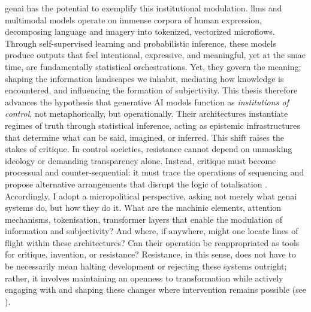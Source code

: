 \Gls{genai}  has the potential to exemplify this institutional modulation. \Glspl{llm}  and multimodal models operate on immense corpora of human expression, decomposing language and imagery into tokenized, vectorized microflows. Through self-supervised learning and probabilistic inference, these models produce outputs that feel intentional, expressive, and meaningful, yet at the smae time, are fundamentally statistical orchestrations. Yet, they govern the meaning; shaping the information landscapes we inhabit, mediating how knowledge is encountered, and influencing the formation of subjectivity.
This thesis therefore advances the hypothesis that generative AI models function as \emph{institutions of control}, not metaphorically, but operationally. Their architectures instantiate regimes of truth through statistical inference, acting as epistemic infrastructures that determine what can be said, imagined, or inferred. This shift raises the stakes of critique. In control societies, resistance cannot depend on unmasking ideology or demanding transparency alone. Instead, critique must become processual and counter-sequential: it must trace the operations of sequencing and propose alternative arrangements that disrupt the logic of totalisation \parencite{mackenzie2021}. Accordingly, I adopt a micropolitical perspective, asking not merely what \gls{genai} systems do, but how they do it. What are the machinic elements, attention mechanisms, tokenisation, transformer layers that enable the modulation of information and subjectivity? And where, if anywhere, might one locate lines of flight within these architectures? Can their operation be reappropriated as tools for critique, invention, or resistance? Resistance, in this sense, does not have to be necessarily mean halting development or rejecting these systems outright; rather, it involves maintaining an openness to transformation while actively engaging with and shaping these changes where intervention remains possible (see \cite[227]{tucker2021}).



